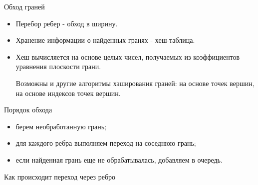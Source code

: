 \documentclass[]{beamer} %
\begin{document}
\begin{frame}{Обход граней}
    \begin{itemize}
        \item Перебор ребер - обход в ширину.
        \item Хранение информации о найденных гранях - хеш-таблица.
        \item Хеш вычисляется на основе целых чисел, получаемых из коэффициентов уравнения плоскости грани.

        Возможны и другие алгоритмы хэширования граней: на основе точек вершин, на основе индексов точек вершин.
    \end{itemize}
    \vfill
    Порядок обхода
    \begin{itemize}
        \item берем необработанную грань;
        \item для каждого ребра выполняем переход на соседнюю грань;
        \item если найденная грань еще не обрабатывалась, добавляем в очередь.
    \end{itemize}
\end{frame}

\begin{frame}[t]{Как происходит переход через ребро }
    \vspace*{-8mm}\hspace*{15mm}%
    \only<1>{}%
    \only<2>{}%
    \only<3>{}%
    \only<6>{}%

\end{frame}
\end{document}
